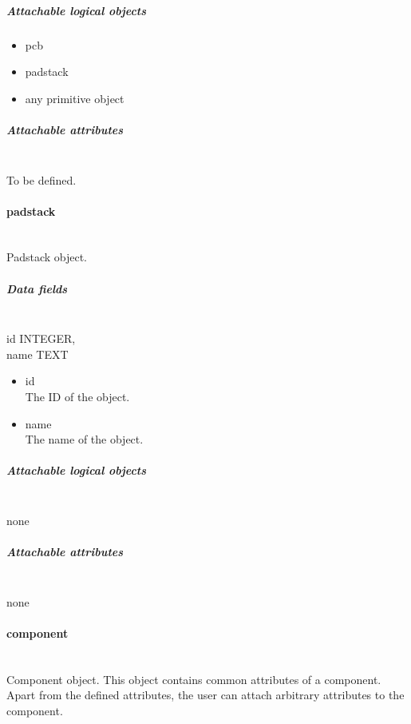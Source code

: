 \documentclass[12pt]{article}
\begin{document}
\subparagraph{Attachable logical objects}\label{attachable-logical-objects}

\begin{itemize}
\item
  pcb
\item
  padstack
\item
  any primitive object
\end{itemize}

\subparagraph{Attachable attributes}

\mbox{}\\

To be defined.

\paragraph{padstack}\label{padstack}

\mbox{}\\

Padstack object.

\subparagraph{Data fields}

\mbox{}\\

id INTEGER,\\
name TEXT

\begin{itemize}
\item id\\
The ID of the object.
\item name\\
The name of the object.
\end{itemize}

\subparagraph{Attachable logical objects}

\mbox{}\\

none

\subparagraph{Attachable attributes}

\mbox{}\\

none

\paragraph{component}\label{component}

\mbox{}\\

Component object. This object contains common attributes of a component.
Apart from the defined attributes, the user can attach arbitrary attributes to
the component.
\end{document}
